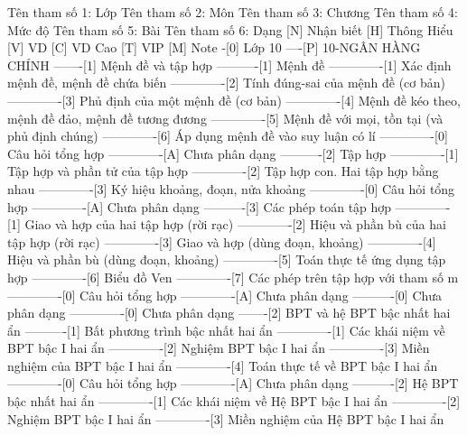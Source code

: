 %
%
%
%
%
Tên tham số 1: Lớp
Tên tham số 2: Môn
Tên tham số 3: Chương
Tên tham số 4: Mức độ
Tên tham số 5: Bài
Tên tham số 6: Dạng
%
%
[N] Nhận biết
[H] Thông Hiểu
[V] VD
[C] VD Cao
[T] VIP
[M] Note
%
%
-[0] Lớp 10
----[P] 10-NGÂN HÀNG CHÍNH
-------[1] Mệnh đề và tập hợp
----------[1] Mệnh đề
-------------[1] Xác định mệnh đề, mệnh đề chứa biến
-------------[2] Tính đúng-sai của mệnh đề (cơ bản)
-------------[3] Phủ định của một mệnh đề (cơ bản)
-------------[4] Mệnh đề kéo theo, mệnh đề đảo, mệnh đề tương đương
-------------[5] Mệnh đề với mọi, tồn tại (và phủ định chúng)
-------------[6] Áp dụng mệnh đề vào suy luận có lí
-------------[0] Câu hỏi tổng hợp
-------------[A] Chưa phân dạng
----------[2] Tập hợp
-------------[1] Tập hợp và phần tử của tập hợp
-------------[2] Tập hợp con. Hai tập hợp bằng nhau
-------------[3] Ký hiệu khoảng, đoạn, nửa khoảng
-------------[0] Câu hỏi tổng hợp
-------------[A] Chưa phân dạng
----------[3] Các phép toán tập hợp
-------------[1] Giao và hợp của hai tập hợp (rời rạc)
-------------[2] Hiệu và phần bù của hai tập hợp (rời rạc)
-------------[3] Giao và hợp (dùng đoạn, khoảng)
-------------[4] Hiệu và phần bù (dùng đoạn, khoảng)
-------------[5] Toán thực tế ứng dụng tập hợp
-------------[6] Biểu đồ Ven
-------------[7] Các phép trên tập hợp với tham số m
-------------[0] Câu hỏi tổng hợp
-------------[A] Chưa phân dạng
----------[0] Chưa phân dạng
-------------[0] Chưa phân dạng
-------[2] BPT và hệ BPT bậc nhất hai ẩn
----------[1] Bất phương trình bậc nhất hai ẩn
-------------[1] Các khái niệm về BPT bậc I hai ẩn
-------------[2] Nghiệm BPT bậc I hai ẩn
-------------[3] Miền nghiệm của BPT bậc I hai ẩn
-------------[4] Toán thực tế về BPT bậc I hai ẩn
-------------[0] Câu hỏi tổng hợp
-------------[A] Chưa phân dạng
----------[2] Hệ BPT bậc nhất hai ẩn
-------------[1] Các khái niệm về Hệ BPT bậc I hai ẩn
-------------[2] Nghiệm BPT bậc I hai ẩn
-------------[3] Miền nghiệm của Hệ BPT bậc I hai ẩn
